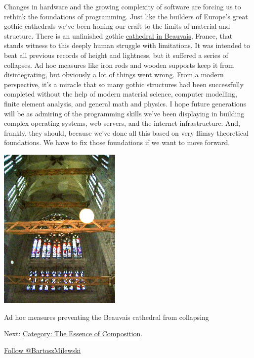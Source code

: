 Changes in hardware and the growing complexity of software are forcing
us to rethink the foundations of programming. Just like the builders of
Europe's great gothic cathedrals we've been honing our craft to the
limits of material and structure. There is an unfinished gothic
\href{http://en.wikipedia.org/wiki/Beauvais_Cathedral}{cathedral in
Beauvais}, France, that stands witness to this deeply human struggle
with limitations. It was intended to beat all previous records of height
and lightness, but it suffered a series of collapses. Ad hoc measures
like iron rods and wooden supports keep it from disintegrating, but
obviously a lot of things went wrong. From a modern perspective, it's a
miracle that so many gothic structures had been successfully completed
without the help of modern material science, computer modelling, finite
element analysis, and general math and physics. I hope future
generations will be as admiring of the programming skills we've been
displaying in building complex operating systems, web servers, and the
internet infrastructure. And, frankly, they should, because we've done
all this based on very flimsy theoretical foundations. We have to fix
those foundations if we want to move forward.

\hypertarget{attachment_3472}{}
\includegraphics[width=2.34375in]{images/beauvais_interior_supports.jpg}

Ad hoc measures preventing the Beauvais cathedral from collapsing

Next:
\href{https://bartoszmilewski.com/2014/11/04/category-the-essence-of-composition/}{Category:
The Essence of Composition}.

\href{https://twitter.com/BartoszMilewski}{Follow @BartoszMilewski}
